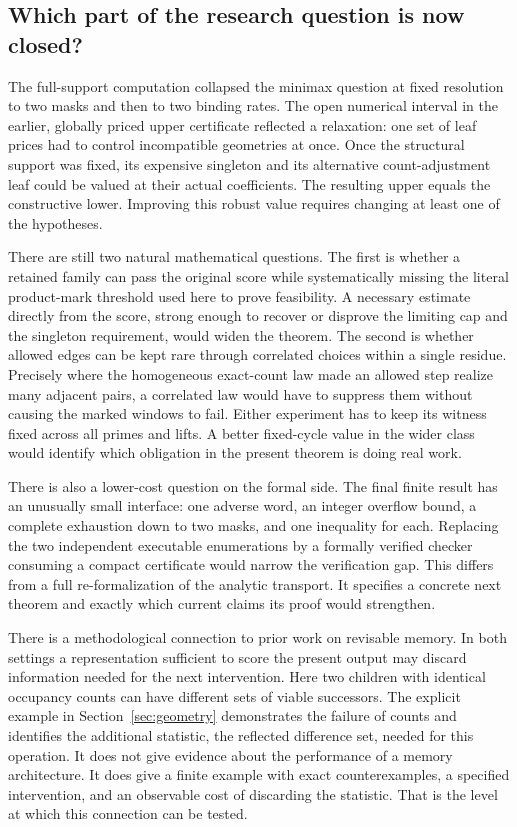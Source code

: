 \subsection{Which part of the research question is now closed?}
The full-support computation collapsed the minimax question at fixed resolution to two masks and then to two binding rates. The open numerical interval in the earlier, globally priced upper certificate reflected a relaxation: one set of leaf prices had to control incompatible geometries at once. Once the structural support was fixed, its expensive singleton and its alternative count-adjustment leaf could be valued at their actual coefficients. The resulting upper equals the constructive lower. Improving this robust value requires changing at least one of the hypotheses.

There are still two natural mathematical questions. The first is whether a retained family can pass the original score while systematically missing the literal product-mark threshold used here to prove feasibility. A necessary estimate directly from the score, strong enough to recover or disprove the limiting cap and the singleton requirement, would widen the theorem. The second is whether allowed edges can be kept rare through correlated choices within a single residue. Precisely where the homogeneous exact-count law made an allowed step realize many adjacent pairs, a correlated law would have to suppress them without causing the marked windows to fail. Either experiment has to keep its witness fixed across all primes and lifts. A better fixed-cycle value in the wider class would identify which obligation in the present theorem is doing real work.

There is also a lower-cost question on the formal side. The final finite result has an unusually small interface: one adverse word, an integer overflow bound, a complete exhaustion down to two masks, and one inequality for each. Replacing the two independent executable enumerations by a formally verified checker consuming a compact certificate would narrow the verification gap. This differs from a full re-formalization of the analytic transport. It specifies a concrete next theorem and exactly which current claims its proof would strengthen.

There is a methodological connection to prior work on revisable memory. In both settings a representation sufficient to score the present output may discard information needed for the next intervention. Here two children with identical occupancy counts can have different sets of viable successors. The explicit example in Section~\ref{sec:geometry} demonstrates the failure of counts and identifies the additional statistic, the reflected difference set, needed for this operation. It does not give evidence about the performance of a memory architecture. It does give a finite example with exact counterexamples, a specified intervention, and an observable cost of discarding the statistic. That is the level at which this connection can be tested.
